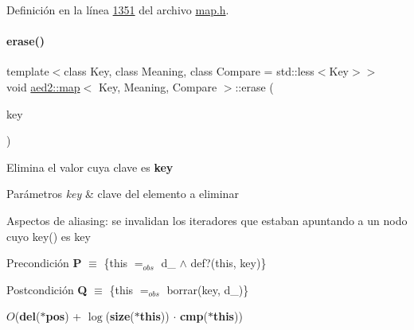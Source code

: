 Definición en la línea \hyperlink{map_8h_source_l01351}{1351} del archivo \hyperlink{map_8h_source}{map.\+h}.

\mbox{\label{classaed2_1_1map_a2ffadb42cd5f0bc7b3752ff159b75334_a2ffadb42cd5f0bc7b3752ff159b75334}} 
\paragraph{\texorpdfstring{erase()}{erase()}\hspace{0.1cm}{\footnotesize\ttfamily [2/2]}}
{\footnotesize\ttfamily template$<$class Key, class Meaning, class Compare = std\+::less$<$\+Key$>$$>$ \\
void \hyperlink{classaed2_1_1map}{aed2\+::map}$<$ Key, Meaning, Compare $>$\+::erase (\begin{DoxyParamCaption}\item[{const Key \&}]{key }\end{DoxyParamCaption})\hspace{0.3cm}{\ttfamily [inline]}}



Elimina el valor cuya clave es {\bfseries key} 


\begin{DoxyParams}{Parámetros}
{\em key} & clave del elemento a eliminar\\
\hline
\end{DoxyParams}
\begin{DoxyParagraph}{Aspectos de aliasing\+:}
se invalidan los iteradores que estaban apuntando a un nodo cuyo key() es key
\end{DoxyParagraph}
\begin{DoxyPrecond}{Precondición}
{\bfseries P} $\equiv$ \{this $=_{obs}$ d\+\_ $\land$ def?(this, key)\} 
\end{DoxyPrecond}
\begin{DoxyPostcond}{Postcondición}
{\bfseries Q} $\equiv$ \{this $=_{obs}$ borrar(key, d\+\_)\}
\end{DoxyPostcond}

\begin{DoxyDescription}
\item[Complejidad Temporal]$O$({\bfseries del}({\bfseries $\ast$pos}) + $\log$({\bfseries size}({\bfseries $\ast$this})) $\cdot$ {\bfseries cmp}({\bfseries $\ast$this}))
\end{DoxyDescription}

